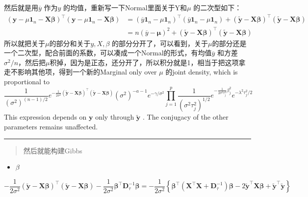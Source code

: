 \documentclass[
]{book}
\providecommand{\tightlist}{%
  \setlength{\itemsep}{0pt}\setlength{\parskip}{0pt}}
\theoremstyle{definition}
\theoremstyle{definition}
\theoremstyle{definition}
\theoremstyle{remark}
\begin{document}
然后就是用\(\overline y\) 作为\(y\) 的均值，重新写一下Normal里面关于Y和\(\mu\) 的二次型如下：
\[
\begin{aligned}\left(\boldsymbol{y}-\mu \mathbf{1}_{n}-\boldsymbol{X} \boldsymbol{\beta}\right)^{\top}\left(\boldsymbol{y}-\mu \mathbf{1}_{n}-\boldsymbol{X} \boldsymbol{\beta}\right) &=\left(\overline{y} \mathbf{1}_{n}-\mu \mathbf{1}_{n}\right)^{\top}\left(\overline{y} \mathbf{1}_{n}-\mu \mathbf{1}_{n}\right)+(\tilde{\boldsymbol{y}}-\boldsymbol{X} \boldsymbol{\beta})^{\top}(\tilde{\boldsymbol{y}}-\boldsymbol{X} \boldsymbol{\beta}) \\ &=n(\overline{y}-\boldsymbol{\mu})^{2}+(\tilde{\boldsymbol{y}}-\boldsymbol{X} \boldsymbol{\beta})^{\top}(\tilde{\boldsymbol{y}}-\boldsymbol{X} \boldsymbol{\beta}) \end{aligned}
\]
所以就把关于\(\mu\)的部分和关于\(y,X,\beta\) 的部分分开了，可以看到，关于\(\mu\)的部分还是一个二次型，配合前面的系数，可以凑成一个Normal的形式，有均值\(\overline y\) 和方差\(\sigma^2/n\)，然后把\(\mu\)积掉，因为是正态，还分开了，所以积分就是1，相当于把这项拿走不影响其他项，得到一个新的Marginal only over \(\mu\) 的joint density, which is proportional to
\[
\frac{1}{\left(\sigma^{2}\right)^{(n-1) / 2}} e^{-\frac{1}{2 \sigma^{2}}(\tilde{\boldsymbol{y}}-\boldsymbol{X} \boldsymbol{\beta})^{\top}(\tilde{\boldsymbol{y}}-\boldsymbol{X} \boldsymbol{\beta})}\left(\sigma^{2}\right)^{-a-1} e^{-\gamma / \sigma^{2}} \prod_{j=1}^{p} \frac{1}{\left(\sigma^{2} \tau_{j}^{2}\right)^{1 / 2}} e^{-\frac{1}{2 \sigma^{2} \tau_{j}^{2}} \beta_{j}^{2}} e^{-\lambda^{2} \tau_{j}^{2} / 2}
\]
This expression depends on \(\boldsymbol y\) only through \(\tilde{\boldsymbol{y}}\) . The conjugacy of the other parameters remains unaffected.

\begin{center}\rule{0.5\linewidth}{0.5pt}\end{center}

\begin{quote}
然后就能构建Gibbs
\end{quote}

\begin{itemize}
\tightlist
\item
  \(\beta\)
\end{itemize}

\[
-\frac{1}{2 \sigma^{2}}(\tilde{\boldsymbol{y}}-\boldsymbol{X} \boldsymbol{\beta})^{\top}(\tilde{\boldsymbol{y}}-\boldsymbol{X} \boldsymbol{\beta})-\frac{1}{2 \sigma^{2}} \boldsymbol{\beta}^{\top} \boldsymbol{D}_{\tau}^{-1} \boldsymbol{\beta}=-\frac{1}{2 \sigma^{2}}\left\{\boldsymbol{\beta}^{\top}\left(\boldsymbol{X}^{\top} \boldsymbol{X}+\boldsymbol{D}_{\tau}^{-1}\right) \boldsymbol{\beta}-2 \tilde{\boldsymbol{y}}^{\top} \boldsymbol{X} \boldsymbol{\beta}+\tilde{\boldsymbol{y}}^{\top} \tilde{\boldsymbol{y}}\right\}
\]
\end{document}
